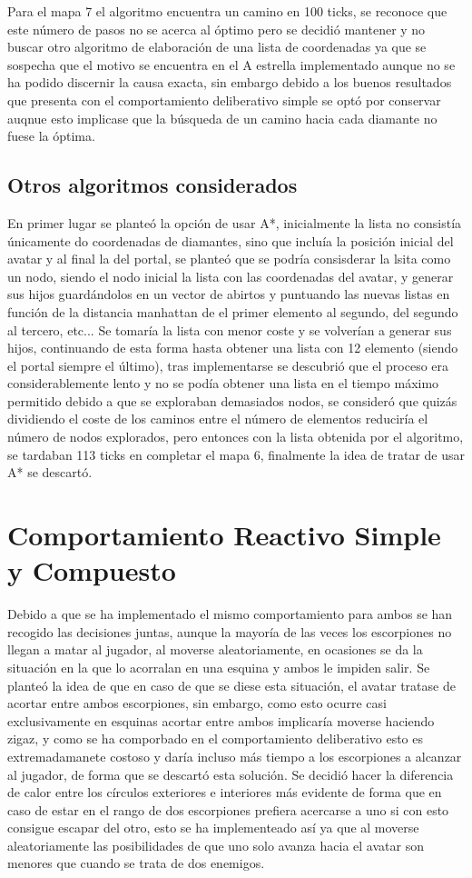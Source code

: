 Para el mapa 7 el algoritmo encuentra un camino en 100 ticks, se reconoce que este número de pasos no se acerca al óptimo pero se decidió mantener y no buscar otro algoritmo de elaboración de una lista de coordenadas ya que se sospecha que el motivo se encuentra en el A estrella implementado aunque no se ha podido discernir la causa exacta, sin embargo debido a los buenos resultados que presenta con el comportamiento deliberativo simple se optó por conservar auqnue esto implicase que la búsqueda de un camino hacia cada diamante no fuese la óptima.

\subsection{Otros algoritmos considerados}
En primer lugar se planteó la opción de usar A*, inicialmente la lista no consistía únicamente do coordenadas de diamantes, sino que incluía la posición inicial del avatar y al final la del portal, se planteó que se podría consisderar la lsita como un nodo, siendo el nodo inicial la lista con las coordenadas del avatar, y generar sus hijos guardándolos en un vector de abirtos y puntuando las nuevas listas en función de la distancia manhattan de el primer elemento al segundo, del segundo al tercero, etc... Se tomaría la lista con menor coste y se volverían a generar sus hijos, continuando de esta forma hasta obtener una lista con 12 elemento (siendo el portal siempre el último), tras implementarse se descubrió que el proceso era considerablemente lento y no se podía obtener una lista en el tiempo máximo permitido debido a que se exploraban demasiados nodos, se consideró que quizás dividiendo el coste de los caminos entre el número de elementos reduciría el número de nodos explorados, pero entonces con la lista obtenida por el algoritmo, se tardaban 113 ticks en completar el mapa 6, finalmente la idea de tratar de usar A* se descartó.

\section{Comportamiento Reactivo Simple y Compuesto}
Debido a que se ha implementado el mismo comportamiento para ambos se han recogido las decisiones juntas, aunque la mayoría de las veces los escorpiones no llegan a matar al jugador, al moverse aleatoriamente, en ocasiones se da la situación en la que lo acorralan en una esquina y ambos le impiden salir. Se planteó la idea de que en caso de que se diese esta situación, el avatar tratase de acortar entre ambos escorpiones, sin embargo, como esto ocurre casi exclusivamente en esquinas acortar entre ambos implicaría moverse haciendo zigaz, y como se ha comporbado en el comportamiento deliberativo esto es extremadamanete costoso y daría incluso más tiempo a los escorpiones a alcanzar al jugador, de forma que se descartó esta solución. Se decidió hacer la diferencia de calor entre los círculos exteriores e interiores más evidente de forma que en caso de estar en el rango de dos escorpiones prefiera acercarse a uno si con esto consigue escapar del otro, esto se ha implementeado así ya que al moverse aleatoriamente las posibilidades de que uno solo avanza hacia el avatar son menores que cuando se trata de dos enemigos.

